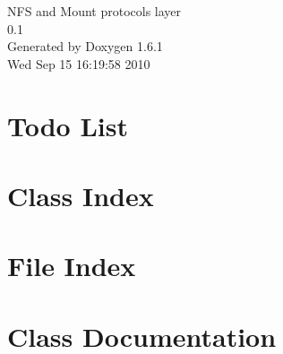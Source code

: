 \documentclass[a4paper]{book}
\begin{document}
\begin{titlepage}
\vspace*{7cm}
\begin{center}
{\Large NFS and Mount protocols layer \\[1ex]\large 0.1 }\\
\vspace*{1cm}
{\large Generated by Doxygen 1.6.1}\\
\vspace*{0.5cm}
{\small Wed Sep 15 16:19:58 2010}\\
\end{center}
\end{titlepage}
\clearemptydoublepage
{}
\tableofcontents
\clearemptydoublepage
{}
\chapter{Todo List}
\label{todo}

\chapter{Class Index}

\chapter{File Index}

\chapter{Class Documentation}


\end{document}
